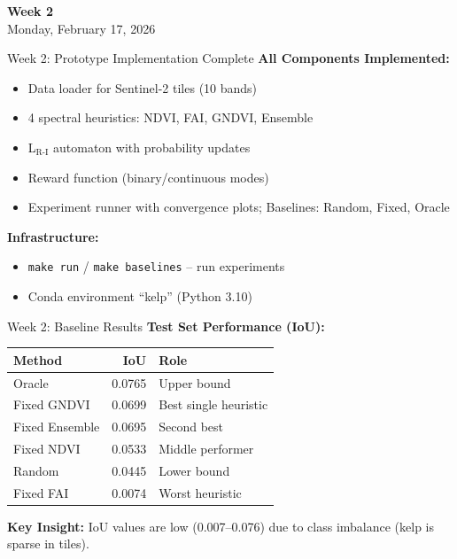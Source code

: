 \documentclass[10pt,xcolor={table,dvipsnames},t]{beamer}
\begin{document}
\begin{frame}
\centering
\vfill
{\Large\textbf{Week 2}}\\[1em]
{\large Monday, February 17, 2026}
\vfill
\end{frame}

\begin{frame}{Week 2: Prototype Implementation Complete}
\small
\textbf{All Components Implemented:}
\begin{itemize}
  \item Data loader for Sentinel-2 tiles (10 bands)
  \item 4 spectral heuristics: NDVI, FAI, GNDVI, Ensemble
  \item L$_{\text{R-I}}$ automaton with probability updates
  \item Reward function (binary/continuous modes)
  \item Experiment runner with convergence plots; Baselines: Random, Fixed, Oracle
\end{itemize}

\vspace{0.2em}
\textbf{Infrastructure:}
\begin{itemize}
  \item \texttt{make run} / \texttt{make baselines} -- run experiments
  \item Conda environment ``kelp'' (Python 3.10)
\end{itemize}

\end{frame}

\begin{frame}{Week 2: Baseline Results}
\small
\textbf{Test Set Performance (IoU):}

\vspace{0.3em}
\begin{table}
\centering
\footnotesize
\begin{tabular}{lrl}
\toprule
\textbf{Method} & \textbf{IoU} & \textbf{Role} \\
\midrule
Oracle & 0.0765 & Upper bound \\
Fixed GNDVI & 0.0699 & Best single heuristic \\
Fixed Ensemble & 0.0695 & Second best \\
Fixed NDVI & 0.0533 & Middle performer \\
Random & 0.0445 & Lower bound \\
Fixed FAI & 0.0074 & Worst heuristic \\
\bottomrule
\end{tabular}
\end{table}

\vspace{0.3em}
\textbf{Key Insight:} IoU values are low (0.007--0.076) due to class imbalance (kelp is sparse in tiles).

\end{frame}
\end{document}
